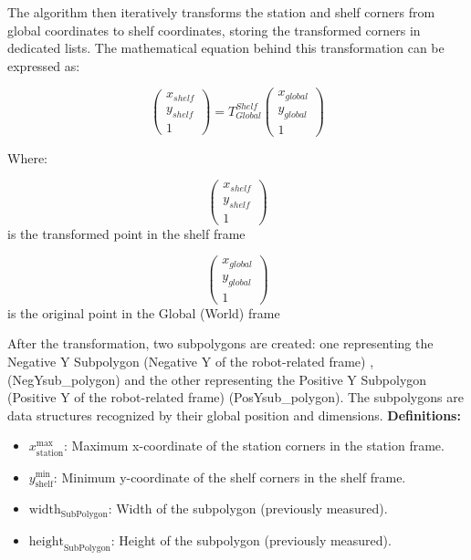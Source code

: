 The algorithm then iteratively transforms the station and shelf corners from global coordinates to shelf coordinates, 
storing the transformed corners in dedicated lists. 
The mathematical equation behind this transformation can be expressed as:

\begin{equation}
\begin{pmatrix}
x_{shelf} \\
y_{shelf} \\
1
\end{pmatrix}
=
T_{Global}^{Shelf}
\begin{pmatrix}
x_{global} \\
y_{global} \\
1
\end{pmatrix}
\end{equation}

Where:

\begin{equation}
\begin{pmatrix}
x_{shelf} \\
y_{shelf} \\
1
\end{pmatrix}
\end{equation}
is the transformed point in the shelf frame 

\begin{equation}
\begin{pmatrix}
x_{global} \\
y_{global} \\
1
\end{pmatrix}
\end{equation}
is the original point in the Global (World) frame

After the transformation, two subpolygons are created: one 
representing the Negative Y Subpolygon (Negative Y of the robot-related frame) ,(NegYsub\_polygon) and the other representing the 
Positive Y Subpolygon (Positive Y of the robot-related frame)
(PosYsub\_polygon). 
The subpolygons are data structures recognized by their global position and dimensions.
\newline \textbf{Definitions:}

\begin{itemize}
    \item $x_{\text{station}}^{\text{max}}$: Maximum x-coordinate of the station corners in the station frame.
    \item $y_{\text{shelf}}^{\text{min}}$: Minimum y-coordinate of the shelf corners in the shelf frame.
    \item $\text{width}_{\text{SubPolygon}}$: Width of the subpolygon (previously measured).
    \item $\text{height}_{\text{SubPolygon}}$: Height of the subpolygon (previously measured).
\end{itemize}


